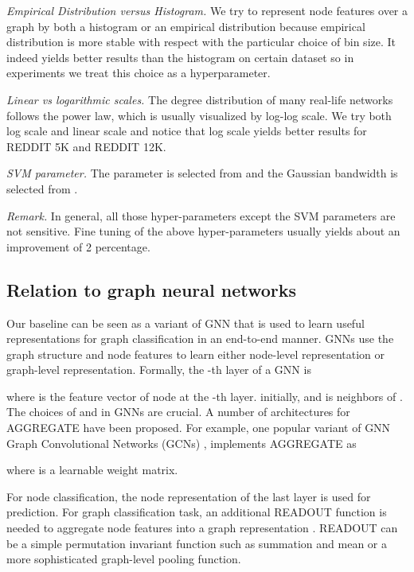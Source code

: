 \documentclass[11pt,onecolumn]{article}
\begin{document}
\emph{Empirical Distribution versus Histogram.} We try to represent node features over a graph by both a histogram or an empirical distribution because empirical distribution is more stable with respect with the particular choice of bin size. It indeed yields better results than the histogram on certain dataset so in experiments we treat this choice as a hyperparameter. 

\emph{Linear vs logarithmic scales.} The degree distribution of many real-life networks follows the power law, which is usually visualized by log-log scale. We try both log scale and linear scale and notice that log scale yields better results for REDDIT 5K and REDDIT 12K. 

\emph{SVM parameter.} The  parameter is selected from  and the Gaussian bandwidth is selected from . 

\emph{Remark.} In general, all those hyper-parameters except the SVM parameters are not sensitive.  Fine tuning of the above hyper-parameters usually yields about an improvement of 2 percentage. 


\subsection{Relation to graph neural networks }
Our baseline can be seen as a variant of GNN that is used to learn useful representations for graph classification in an end-to-end manner.  GNNs use the graph structure  and node features  to learn either node-level representation or graph-level representation. Formally, the -th layer of a GNN is

where  is the feature vector of node  at the -th layer.  initially, and  is neighbors of . The choices of  and  in GNNs are crucial. A number of architectures for AGGREGATE have been proposed. For example, one popular variant of GNN Graph Convolutional Networks (GCNs) \cite{kipf2016semi}, implements AGGREGATE as

where  is a learnable weight matrix. 

For node classification, the node representation  of the last layer is used for prediction. For graph classification task, an additional READOUT function is needed to aggregate node features into a graph representation . READOUT can be a simple permutation invariant function such as summation and mean or a more sophisticated graph-level pooling function. \cite{ying2018hierarchical, zhang2018end}
\end{document}
